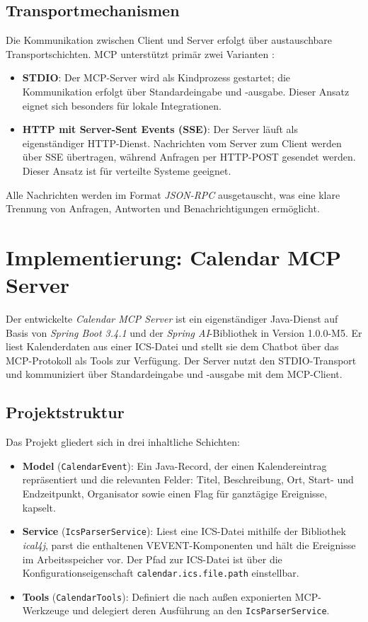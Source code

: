 \subsection{Transportmechanismen}

Die Kommunikation zwischen Client und Server erfolgt über austauschbare Transport\-schichten.
MCP unterstützt primär zwei Varianten \cite{mcpspec}:

\begin{itemize}
    \item \textbf{STDIO}: Der MCP-Server wird als Kindprozess gestartet; die Kommunikation
    erfolgt über Standard\-eingabe und -ausgabe. Dieser Ansatz eignet sich besonders für
    lokale Integrationen.
    \item \textbf{HTTP mit Server-Sent Events (SSE)}: Der Server läuft als eigenständiger
    HTTP-Dienst. Nachrichten vom Server zum Client werden über SSE übertragen, während
    Anfragen per HTTP-POST gesendet werden. Dieser Ansatz ist für verteilte Systeme geeignet.
\end{itemize}

Alle Nachrichten werden im Format \emph{JSON-RPC} ausgetauscht, was eine klare
Trennung von Anfragen, Antworten und Benachrichtigungen ermöglicht.

\section{Implementierung: Calendar MCP Server}

Der entwickelte \emph{Calendar MCP Server} ist ein eigenständiger Java-Dienst auf Basis
von \emph{Spring Boot 3.4.1} und der \emph{Spring AI}-Bibliothek in Version 1.0.0-M5.
Er liest Kalenderdaten aus einer ICS-Datei und stellt sie dem Chatbot über das MCP-Protokoll
als Tools zur Verfügung. Der Server nutzt den STDIO-Transport und kommuniziert über
Standard\-eingabe und -ausgabe mit dem MCP-Client.

\subsection{Projektstruktur}

Das Projekt gliedert sich in drei inhaltliche Schichten:

\begin{itemize}
    \item \textbf{Model} (\texttt{CalendarEvent}): Ein Java-Record, der einen Kalender\-eintrag
    repräsentiert und die relevanten Felder: Titel, Beschreibung, Ort, Start- und Endzeitpunkt,
    Organisator sowie einen Flag für ganztägige Ereignisse, kapselt.
    \item \textbf{Service} (\texttt{IcsParserService}): Liest eine ICS-Datei mithilfe der
    Bibliothek \emph{ical4j}, parst die enthaltenen VEVENT-Komponenten und hält die Ereignisse
    im Arbeitsspeicher vor. Der Pfad zur ICS-Datei ist über die Konfigurationseigenschaft
    \texttt{calendar.ics.file.path} einstellbar.
    \item \textbf{Tools} (\texttt{CalendarTools}): Definiert die nach außen exponierten
    MCP-Werkzeuge und delegiert deren Ausführung an den \texttt{IcsParserService}.
\end{itemize}

